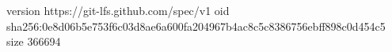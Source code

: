 version https://git-lfs.github.com/spec/v1
oid sha256:0e8d06b5e753f6c03d8ae6a600fa204967b4ac8c5c8386756ebff898c0d454c5
size 366694
